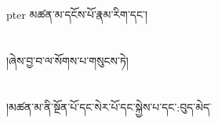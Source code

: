 pter{ }མཚན་མ་དངོས་པོ་རྣམ་རིག་དང་།\chapter{ }།ཞེས་བྱ་བ་ལ་སོགས་པ་གསུངས་ཏེ།\chapter{ }།མཚན་མ་ནི་སྔོན་པོ་དང་སེར་པོ་དང་སྐྱེས་པ་དང་:བུད་མེད་\f